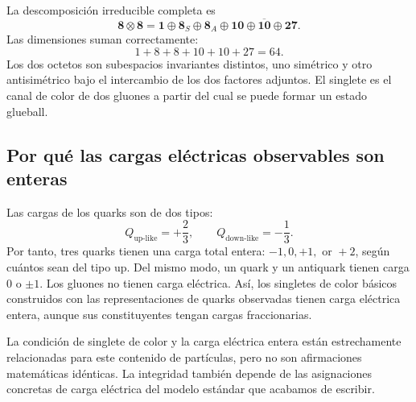 La descomposición irreducible completa es
\begin{equation}
\boldsymbol 8\otimes\boldsymbol 8
=\boldsymbol 1\oplus\boldsymbol 8_S\oplus\boldsymbol 8_A
\oplus\boldsymbol{10}\oplus\overline{\boldsymbol{10}}
\oplus\boldsymbol{27}.
\label{eq:l4-eight-times-eight}
\end{equation}
Las dimensiones suman correctamente:
\begin{equation}
1+8+8+10+10+27=64.
\end{equation}
Los dos octetos son subespacios invariantes distintos, uno simétrico y otro antisimétrico bajo el intercambio de los dos factores adjuntos. El singlete es el canal de color de dos gluones a partir del cual se puede formar un estado glueball.

\subsection{Por qué las cargas eléctricas observables son enteras}

Las cargas de los quarks son de dos tipos:
\begin{equation}
Q_{\mathrm{up\text{-}like}}=+\frac23,
\qquad
Q_{\mathrm{down\text{-}like}}=-\frac13.
\end{equation}
Por tanto, tres quarks tienen una carga total entera: \(-1,0,+1,\text{ or }+2\), según cuántos sean del tipo up. Del mismo modo, un quark y un antiquark tienen carga \(0\) o \(\pm1\). Los gluones no tienen carga eléctrica. Así, los singletes de color básicos construidos con las representaciones de quarks observadas tienen carga eléctrica entera, aunque sus constituyentes tengan cargas fraccionarias.

\begin{classroomqa}
\end{classroomqa}

La condición de singlete de color y la carga eléctrica entera están estrechamente relacionadas para este contenido de partículas, pero no son afirmaciones matemáticas idénticas. La integridad también depende de las asignaciones concretas de carga eléctrica del modelo estándar que acabamos de escribir.

